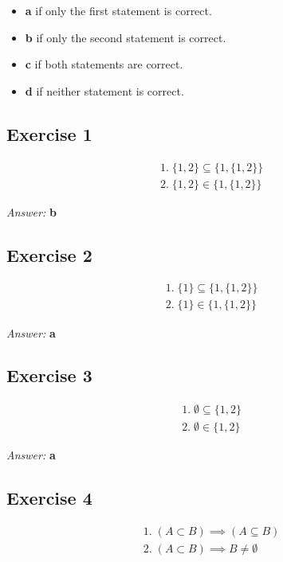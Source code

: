 \documentclass[11pt]{article}
\begin{document}
\begin{itemize}
\item \textbf{a} if only the first statement is correct.
\item \textbf{b} if only the second statement is correct.
\item \textbf{c} if both statements are correct.
\item \textbf{d} if neither statement is correct.
\end{itemize}

\subsection{Exercise 1}
\label{sec-2-1}
\begin{equation}
\begin{split}
& 1.\; \{1, 2\} \subseteq \{1, \{1, 2\}\} \\
& 2.\; \{1, 2\} \in \{1, \{1, 2\}\}
\end{split}
\end{equation}

\emph{Answer:} \textbf{b}
\subsection{Exercise 2}
\label{sec-2-2}
\begin{equation}
\begin{split}
& 1.\; \{1\} \subseteq \{1, \{1, 2\}\} \\
& 2.\; \{1\} \in \{1, \{1, 2\}\}
\end{split}
\end{equation}

\emph{Answer:} \textbf{a}
\subsection{Exercise 3}
\label{sec-2-3}
\begin{equation}
\begin{split}
& 1.\; \emptyset \subseteq \{1, 2\} \\
& 2.\; \emptyset \in \{1, 2\}
\end{split}
\end{equation}

\emph{Answer:} \textbf{a}
\subsection{Exercise 4}
\label{sec-2-4}
\begin{equation}
\begin{split}
& 1.\; (A \subset B) \implies (A \subseteq B) \\
& 2.\; (A \subset B) \implies B \neq \emptyset
\end{split}
\end{equation}
\end{document}
